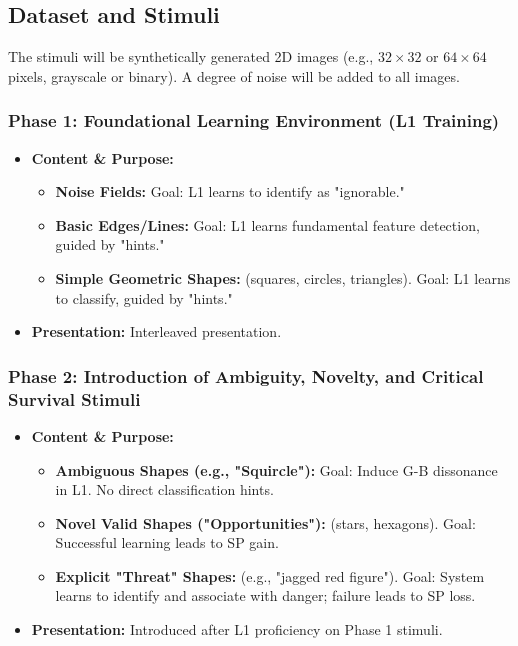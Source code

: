 \documentclass{article}
\begin{document}
\subsection{Dataset and Stimuli}
The stimuli will be synthetically generated 2D images (e.g., $32 \times 32$ or $64 \times 64$ pixels, grayscale or binary). A degree of noise will be added to all images.

\subsubsection{Phase 1: Foundational Learning Environment (L1 Training)}
\begin{itemize}
    \item \textbf{Content \& Purpose:}
    \begin{itemize}
        \item \textbf{Noise Fields:} Goal: L1 learns to identify as "ignorable."
        \item \textbf{Basic Edges/Lines:} Goal: L1 learns fundamental feature detection, guided by "hints."
        \item \textbf{Simple Geometric Shapes:} (squares, circles, triangles). Goal: L1 learns to classify, guided by "hints."
    \end{itemize}
    \item \textbf{Presentation:} Interleaved presentation.
\end{itemize}

\subsubsection{Phase 2: Introduction of Ambiguity, Novelty, and Critical Survival Stimuli}
\begin{itemize}
    \item \textbf{Content \& Purpose:}
    \begin{itemize}
        \item \textbf{Ambiguous Shapes (e.g., "Squircle"):} Goal: Induce G-B dissonance in L1. No direct classification hints.
        \item \textbf{Novel Valid Shapes ("Opportunities"):} (stars, hexagons). Goal: Successful learning leads to SP gain.
        \item \textbf{Explicit "Threat" Shapes:} (e.g., "jagged red figure"). Goal: System learns to identify and associate with danger; failure leads to SP loss.
    \end{itemize}
    \item \textbf{Presentation:} Introduced after L1 proficiency on Phase 1 stimuli.
\end{itemize}
\end{document}
